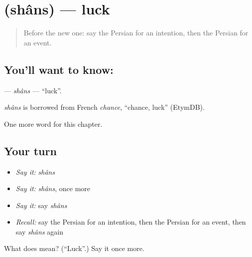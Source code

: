 \section[\texorpdfstring{\fa{شانس} (shâns)}{شانس (shâns)}]{ (shâns) — luck}

\label{lesson:FA-C160-shans}



\begin{quote}
Before the new one: say the Persian for an intention, then the Persian for an event.
\end{quote}

\subsection*{You'll want to know: }
\textbf{} — \emph{shâns} — \textquotedblleft{}luck\textquotedblright{}.

\begin{cousinweb}
\emph{shâns} is borrowed from French \emph{chance}, \textquotedblleft{}chance, luck\textquotedblright{} (EtymDB).
\end{cousinweb}

\begin{grammarlens}[title={What you've built}]
One more word for this chapter.
\end{grammarlens}

\subsection*{Your turn}
\begin{itemize}
\raggedright
  \item \emph{Say it:} \emph{shâns}
  \item \emph{Say it:} \emph{shâns}, once more
  \item \emph{Say it:} say \emph{shâns}
  \item \emph{Recall:} say the Persian for an intention, then the Persian for an event, then say \emph{shâns} again
\end{itemize}

\begin{tcolorbox}[breakable,colback=teal!4,colframe=teal!35!black,title={Before you move on}]
What does  mean? (\textquotedblleft{}Luck\textquotedblright{}.) Say it once more.
\end{tcolorbox}
